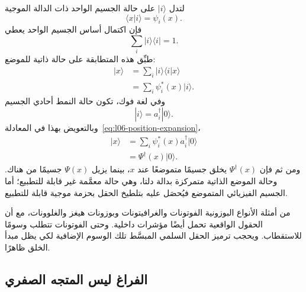 لتدل \(|i\rangle\) على حالة الجسيم الواحد ذات الدالة الموجية
\begin{equation}
\langle x|i\rangle=\psi_i(x).
\end{equation}
فإن اكتمال أساس الجسيم الواحد يعطي
\begin{equation}
\sum_i|i\rangle\langle i|=1.
\label{eq:l06-completeness}
\end{equation}
طبِّق هذه المتطابقة على حالة ذاتية للموضع:
\begin{align}
|x\rangle
&=\sum_i|i\rangle\langle i|x\rangle \\
&=\sum_i\psi_i^*(x)|i\rangle.
\label{eq:l06-position-expansion}
\end{align}
وفي لغة فوك، تكون حالة النمط أحادي الجسيم
\begin{equation}
|i\rangle=a_i^\dagger|0\rangle.
\end{equation}
وبالتعويض بهذا في المعادلة~\eqref{eq:l06-position-expansion}،
\begin{align}
|x\rangle
&=\sum_i\psi_i^*(x)a_i^\dagger|0\rangle \\
&=\Psi^\dagger(x)|0\rangle.
\label{eq:l06-local-creation}
\end{align}
ومن ثم فإن \(\Psi^\dagger(x)\) يخلق جسيمًا متموضعًا عند \(x\)، بينما يزيل \(\Psi(x)\) جسيمًا من هناك. وحالة الموضع الذاتية متمركزة بدالة دلتا، وهي حالة معمَّمة غير قابلة للتطبيع؛ أما الجسيم الفيزيائي المتموضع فيُحصَل عليه بتلطيخ الحقل بحزمة موجية قابلة للتطبيع.

\begin{classroomqa}
\end{classroomqa}

من أمثلة الأنواع البوزونية الفوتونات والغرافيتونات وبوزونات هيغز والغلوونات، مع أن الحقول الواقعية تحمل أيضًا مؤشرات داخلية. وحتى الفوتونات تتطلب وسومًا للاستقطاب. ويحجب ترميز الحقل السلمي المبسَّط تلك الوسوم الإضافية لكي يظل مبدأ الخلق ظاهرًا.

\subsection{الفراغ ليس المتجه الصفري}

